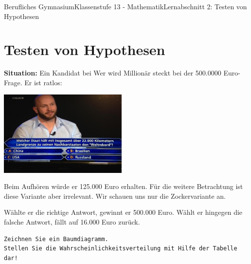 \documentclass[11pt,twocolumn,oneside,openany,headings=optiontotoc,11pt,numbers=noenddot]{article}
\begin{document}
	\begin{worksheet}{Berufliches Gymnasium}{Klassenstufe 13 - Mathematik}{Lernabschnitt 2: Testen von Hypothesen}
		\setcounter{section}{3}
		\section{Testen von Hypothesen}
		\textbf{Situation:} Ein Kandidat bei \glqq{}Wer wird Millionär\grqq{} steckt bei der 500.0000 Euro-Frage. Er ist ratlos:\\
		\par\noindent
		\includegraphics[width=0.48\textwidth]{../99_Bilder/04_WKR/wwm.jpg}\\
		\par\noindent
		Beim Aufhören würde er 125.000 Euro erhalten. Für die weitere Betrachtung ist diese Variante aber irrelevant. Wir schauen uns nur die \grqq{}Zockervariante\grqq{} an.\\
		\par\noindent
		Wählte er die richtige Antwort, gewinnt er 500.000 Euro. Wählt er hingegen die falsche Antwort, fällt auf 16.000 Euro zurück.\\
		\par\noindent
		\texttt{\footnotesize{Zeichnen Sie ein Baumdiagramm.\\Stellen Sie die Wahrscheinlichkeitsverteilung mit Hilfe der Tabelle dar!}}
	\end{worksheet}
\end{document}
